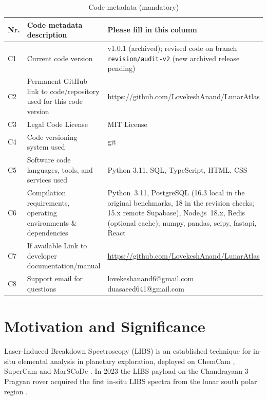 \documentclass[final,5p,twocolumn,a4paper]{elsarticle}
\begin{document}
\begin{table}[!ht]
\centering
\small
\begin{tabular}{|l|p{7.5cm}|p{7.5cm}|}
\hline
\textbf{Nr.} & \textbf{Code metadata description} & \textbf{Please fill in this column} \\
\hline
C1 & Current code version & v1.0.1 (archived); revised code on branch \texttt{revision/audit-v2} (new archived release pending) \\
\hline
C2 & Permanent GitHub link to code/repository used for this code version & \href{https://github.com/LovekeshAnand/LunarAtlas}{https://github.com/LovekeshAnand/LunarAtlas} \\
\hline
C3 & Legal Code License & MIT License \\
\hline
C4 & Code versioning system used & git \\
\hline
C5 & Software code languages, tools, and services used & Python 3.11, SQL, TypeScript, HTML, CSS \\
\hline
C6 & Compilation requirements, operating environments \& dependencies & Python~3.11, PostgreSQL (16.3 local in the original benchmarks, 18 in the revision checks; 15.x remote Supabase), Node.js~18.x, Redis (optional cache); numpy, pandas, scipy, fastapi, React \\
\hline
C7 & If available Link to developer documentation/manual & \href{https://github.com/LovekeshAnand/LunarAtlas}{https://github.com/LovekeshAnand/LunarAtlas} \\
\hline
C8 & Support email for questions & lovekeshanand6@gmail.com \newline duasaeed641@gmail.com \\
\hline
\end{tabular}
\caption{Code metadata (mandatory)}
\label{table:metadata}
\end{table}

\section{Motivation and Significance}

Laser-Induced Breakdown Spectroscopy (LIBS) is an established technique for in-situ elemental analysis in planetary exploration, deployed on ChemCam \cite{maurice2012chemcam, wiens2012chemcam}, SuperCam \cite{maurice2021supercam, wiens2021supercam} and MarSCoDe \cite{xu2021marscode}. In 2023 the LIBS payload on the Chandrayaan-3 Pragyan rover acquired the first in-situ LIBS spectra from the lunar south polar region \cite{megala2024chandrayaan, sridhar2024libs, isro_chandrayaan3_libs}.
\end{document}
